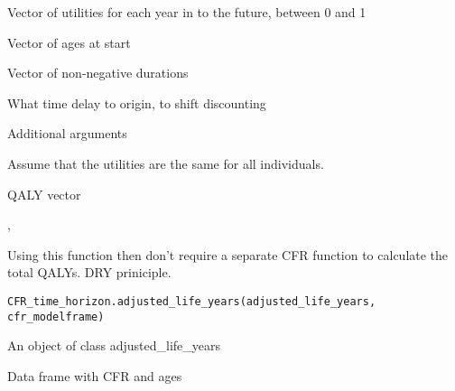 \documentclass[a4paper]{book}
\begin{document}
%
\begin{Arguments}
\begin{ldescription}
\item[\code{utility}] Vector of utilities for each year in to the future, between 0 and 1

\item[\code{age}] Vector of ages at start

\item[\code{time\_horizons}] Vector of non-negative durations

\item[\code{start\_delay}] What time delay to origin, to shift discounting

\item[\code{...}] Additional arguments
\end{ldescription}
\end{Arguments}
%
\begin{Details}\relax
Assume that the utilities are the same for all individuals.
\end{Details}
%
\begin{Value}
QALY vector
\end{Value}
%
\begin{SeeAlso}\relax
{},
\end{SeeAlso}
%
\begin{Description}\relax
Using this function then don't require a separate CFR
function to calculate the total QALYs.
DRY priniciple.
\end{Description}
%
\begin{Usage}
\begin{verbatim}
CFR_time_horizon.adjusted_life_years(adjusted_life_years, cfr_modelframe)
\end{verbatim}
\end{Usage}
%
\begin{Arguments}
\begin{ldescription}
\item[\code{adjusted\_life\_years}] An object of class adjusted\_life\_years

\item[\code{cfr\_modelframe}] Data frame with CFR and ages
\end{ldescription}
\end{Arguments}
\end{document}
